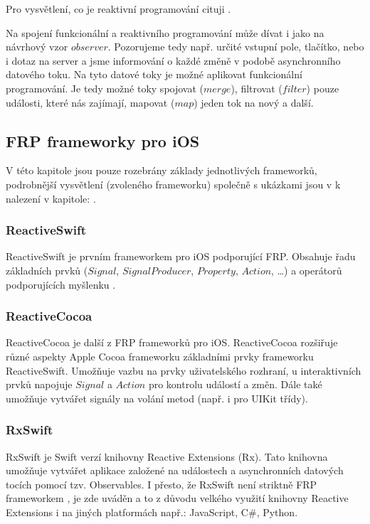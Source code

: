 \documentclass[thesis=M,czech]{FITthesis}[2012/06/26]
\begin{document}
Pro vysvětlení, co je reaktivní programování cituji \cite{Ztaltz2014} .

Na spojení funkcionální a reaktivního programování může dívat i jako na návrhový vzor $observer$. \cite{Blackheath2016} Pozorujeme tedy např. určité vstupní pole, tlačítko, nebo i dotaz na server a jsme informování o každé změně v podobě asynchronního datového toku. Na tyto datové toky je možné aplikovat funkcionální programování. Je tedy možné toky spojovat ($merge$), filtrovat ($filter$) pouze události, které nás zajímají,  mapovat ($map$) jeden tok na nový a další. \cite{Ztaltz2014}

\subsection{FRP frameworky pro iOS}
V této kapitole jsou pouze rozebrány základy jednotlivých frameworků, podrobnější vysvětlení (zvoleného frameworku) společně s ukázkami jsou v k nalezení v kapitole: .
\subsubsection{ReactiveSwift}
ReactiveSwift je prvním frameworkem pro iOS podporující FRP. Obsahuje řadu základních prvků ($Signal$, $SignalProducer$, $Property$, $Action$, \ldots) a operátorů podporujících myšlenku . \cite{ReactiveSwift}
\subsubsection{ReactiveCocoa}
ReactiveCocoa je další z FRP frameworků pro iOS. ReactiveCocoa rozšiřuje různé aspekty Apple Cocoa frameworku základními prvky frameworku ReactiveSwift. Umožňuje vazbu na prvky uživatelského rozhraní, u interaktivních prvků napojuje $Signal$ a $Action$ pro kontrolu událostí a změn. Dále také umožňuje vytvářet signály na volání metod (např. i pro UIKit třídy). \cite{ReactiveCocoa}
\subsubsection{RxSwift}
RxSwift je Swift verzí knihovny Reactive Extensions (Rx). \cite{RxSwift} Tato knihovna umožňuje vytvářet aplikace založené na událostech a asynchronních datových tocích pomocí tzv. Observables. \cite{RxNET} I přesto, že RxSwift není striktně FRP frameworkem \cite{ReactiveExtensionsDocs}, je zde uváděn a to z důvodu velkého využití knihovny Reactive Extensions i na jiných platformách např.: JavaScript, C\#, Python. \cite{ReactiveExtensions}
\end{document}
